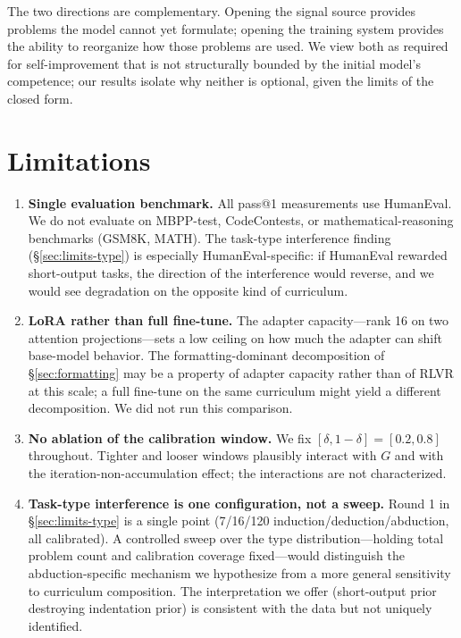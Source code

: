 \documentclass[11pt,a4paper]{article}
\begin{document}
The two directions are complementary.
Opening the signal source provides problems the model cannot yet formulate; opening the training system provides the ability to reorganize how those problems are used.
We view both as required for self-improvement that is not structurally bounded by the initial model's competence; our results isolate why neither is optional, given the limits of the closed form.

\section{Limitations}
\label{sec:limitations}

\begin{enumerate}
    \item[\textbf{L1}] \textbf{Single evaluation benchmark.} All pass@1 measurements use HumanEval. We do not evaluate on MBPP-test, CodeContests, or mathematical-reasoning benchmarks (GSM8K, MATH). The task-type interference finding (\S\ref{sec:limits-type}) is especially HumanEval-specific: if HumanEval rewarded short-output tasks, the direction of the interference would reverse, and we would see degradation on the opposite kind of curriculum.
    \item[\textbf{L2}] \textbf{LoRA rather than full fine-tune.} The adapter capacity---rank 16 on two attention projections---sets a low ceiling on how much the adapter can shift base-model behavior. The formatting-dominant decomposition of \S\ref{sec:formatting} may be a property of adapter capacity rather than of RLVR at this scale; a full fine-tune on the same curriculum might yield a different decomposition. We did not run this comparison.
    \item[\textbf{L3}] \textbf{No ablation of the calibration window.} We fix $[\delta, 1-\delta] = [0.2, 0.8]$ throughout. Tighter and looser windows plausibly interact with $G$ and with the iteration-non-accumulation effect; the interactions are not characterized.
    \item[\textbf{L4}] \textbf{Task-type interference is one configuration, not a sweep.} Round 1 in \S\ref{sec:limits-type} is a single point (7/16/120 induction/deduction/abduction, all calibrated). A controlled sweep over the type distribution---holding total problem count and calibration coverage fixed---would distinguish the abduction-specific mechanism we hypothesize from a more general sensitivity to curriculum composition. The interpretation we offer (short-output prior destroying indentation prior) is consistent with the data but not uniquely identified.

\end{enumerate}
\end{document}
